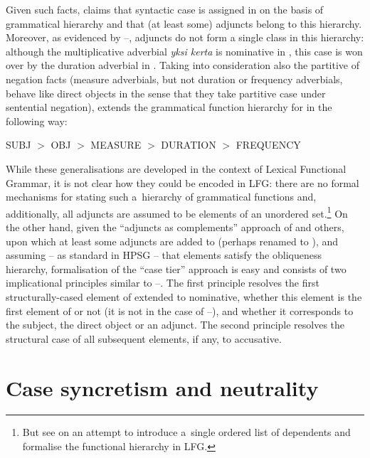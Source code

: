 \documentclass[output=paper]{langsci/langscibook}
\begin{document}
Given such facts,
\citet{mali:93} claims that syntactic case is assigned in  on
the basis of grammatical hierarchy and that (at least some) adjuncts
belong to this hierarchy.  Moreover, as evidenced by
–, adjuncts do not form a single class in this
hierarchy: although the multiplicative adverbial \emph{yksi kerta} is
nominative in , this case is won over by the duration
adverbial in . Taking into consideration also the partitive
of negation facts (measure adverbials, but not duration or frequency
adverbials, behave like direct objects in the sense that they take
partitive case under sentential negation), \citet{mali:93} extends the
grammatical function hierarchy for  in the following way:
\begin{examples}
\item SUBJ $>$ OBJ $>$ MEASURE $>$ DURATION $>$ FREQUENCY
\end{examples}

While these generalisations are developed in the context of Lexical Functional Grammar, it is not clear how they could be encoded in LFG: there are no formal mechanisms for stating such a~hierarchy of grammatical functions and, additionally, all adjuncts are assumed to be elements of an unordered set.\footnote{But see \citealt{prze:16} on an attempt to introduce a~single ordered list of dependents and formalise the functional hierarchy in LFG\@.}  On the other hand, given the “adjuncts as complements” approach of \citealt{BMS2001a-unlinked} and others, upon which at least some adjuncts are added to  (perhaps renamed to ), and assuming – as standard in HPSG – that  elements satisfy the obliqueness hierarchy, formalisation of the “case tier” approach is easy and consists of two implicational principles similar to –.  The first principle resolves the first structurally-cased element of extended  to nominative, whether this element is the first element of  or not (it is not in the case of –), and whether it corresponds to the subject, the direct object or an adjunct.  The second principle resolves the structural case of all subsequent elements, if any, to accusative.






\section{Case syncretism and neutrality}
\label{sec:case:syn}
\end{document}
